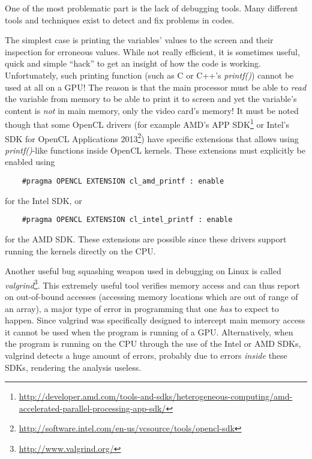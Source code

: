 One of the most problematic part is the lack of debugging tools. Many different
tools and techniques exist to detect and fix problems in codes.

The simplest
case is printing the variables' values to the screen and their inspection for
erroneous values. While not really efficient, it is sometimes useful, quick
and simple ``hack'' to get an insight of how the code is working. Unfortunately,
such printing function (such as C or C++'s \textit{printf()}) cannot be used at
all on a GPU! The reason is that the main processor must be able to
\textit{read} the variable from memory to be able to print it to screen and yet
the variable's content is \textit{not} in main memory, only the video card's
memory! It must be noted though that some OpenCL drivers (for example AMD's
APP SDK\footnote{\url{http://developer.amd.com/tools-and-sdks/heterogeneous-computing/amd-accelerated-parallel-processing-app-sdk/}}
or Intel's SDK for OpenCL Applications
2013\footnote{\url{http://software.intel.com/en-us/vcsource/tools/opencl-sdk}})
have specific extensions that allows using \textit{printf()}-like functions
inside OpenCL kernels. These extensions must explicitly be enabled using
\begin{verbatim}
    #pragma OPENCL EXTENSION cl_amd_printf : enable
\end{verbatim}
for the Intel SDK, or
\begin{verbatim}
    #pragma OPENCL EXTENSION cl_intel_printf : enable
\end{verbatim}
for the AMD SDK. These extensions are possible since these drivers support
running the kernels directly on the CPU.

Another useful bug squashing weapon used in debugging on Linux is called
\textit{valgrind}\footnote{\url{http://www.valgrind.org/}}. This extremely
useful tool verifies memory access and can thus report on out-of-bound accesses
(accessing memory locations which are out of range of an array), a major
type of error in programming that one \textit{has} to expect to happen.
Since valgrind was specifically designed to intercept main memory access it
cannot be used when the program is running of a GPU. Alternatively, when the
program is running on the CPU through the use of the Intel or AMD SDKs, valgrind
detects a huge amount of errors, probably due to errors \textit{inside} these
SDKs, rendering the analysis useless.

